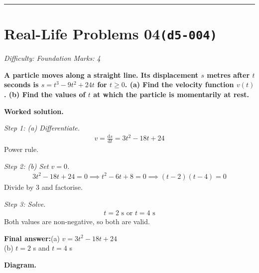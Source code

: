 \documentclass[11pt]{article}
\newcommand{\question}[1]{\par\medskip\noindent\textbf{#1}\par}
\begin{document}
\medskip\hrule

\section*{Real-Life Problems 04\quad\small\texttt{(d5-004)}}
\textit{Difficulty: Foundation \quad\textbar\quad Marks: 4}

\question{A particle moves along a straight line. Its displacement \( s \) metres after \( t \) seconds is \( s = t^3 - 9t^2 + 24t \) for \( t \geq 0 \). (a) Find the velocity function \( v(t) \). (b) Find the values of \( t \) at which the particle is momentarily at rest.}

\textbf{Worked solution.}

\textit{Step 1: (a) Differentiate.}
\[\begin{gathered}
v = \frac{\mathrm{d}s}{\mathrm{d}t} = 3t^2 - 18t + 24
\end{gathered}\]
Power rule.

\textit{Step 2: (b) Set \( v = 0 \).}
\[\begin{gathered}
3t^2 - 18t + 24 = 0 \implies t^2 - 6t + 8 = 0 \implies (t-2)(t-4) = 0
\end{gathered}\]
Divide by 3 and factorise.

\textit{Step 3: Solve.}
\[\begin{gathered}
t = 2 \text{ s or } t = 4 \text{ s}
\end{gathered}\]
Both values are non-negative, so both are valid.

\begin{answerbox}
\textbf{Final answer:}\quad (a) \(\displaystyle  v = 3t^2 - 18t + 24 \) \\[3pt]  (b) \(\displaystyle  t = 2 \) s and \(\displaystyle  t = 4 \) s
\end{answerbox}
\textbf{Diagram.}
\end{document}
